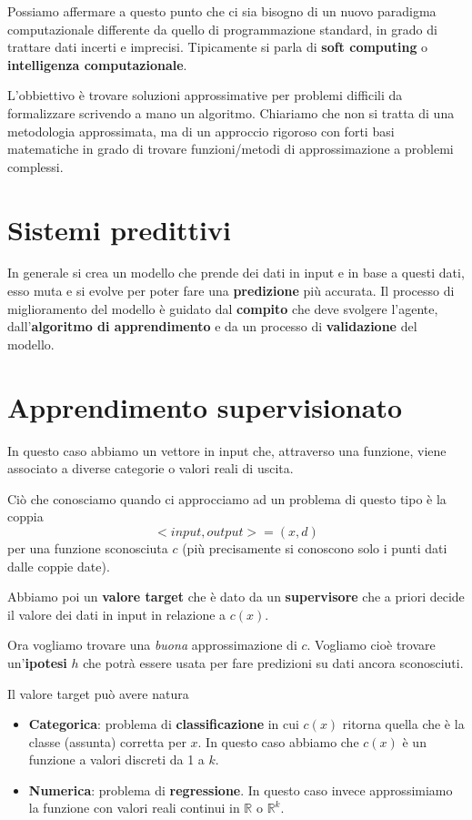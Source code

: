 Possiamo affermare a questo punto che ci sia bisogno di un nuovo paradigma computazionale differente da quello di
programmazione standard, in grado di trattare dati incerti e imprecisi. Tipicamente si parla di \textbf{soft computing} o
\textbf{intelligenza computazionale}.

L'obbiettivo \`e trovare soluzioni approssimative per problemi difficili da formalizzare scrivendo a mano un algoritmo.
Chiariamo che non si tratta di una metodologia approssimata, ma di un approccio rigoroso con forti basi
matematiche in grado di trovare funzioni/metodi di approssimazione a problemi complessi.

\section{Sistemi predittivi}
In generale si crea un modello che prende dei dati in input e in base a questi dati, esso muta e si evolve per poter
fare una \textbf{predizione} pi\`u accurata. Il processo di miglioramento del modello \`e guidato dal \textbf{compito}
che deve svolgere l'agente, dall'\textbf{algoritmo di apprendimento} e da un processo di \textbf{validazione} del modello.

\section{Apprendimento supervisionato}
In questo caso abbiamo un vettore in input che, attraverso una funzione, viene associato a diverse categorie o valori
reali di uscita.

Ci\`o che conosciamo quando ci approcciamo ad un problema di questo tipo \`e la coppia
\[ <input, output> = (x, d) \]
per una funzione sconosciuta $c$ (pi\`u precisamente si conoscono solo i punti dati dalle coppie date).

Abbiamo poi un \textbf{valore target} che \`e dato da un \textbf{supervisore} che a priori decide il valore dei dati
in input in relazione a $c(x)$.

Ora vogliamo trovare una \emph{buona} approssimazione di $c$. Vogliamo cio\`e trovare un'\textbf{ipotesi} $h$ che
potr\`a essere usata per fare predizioni su dati ancora sconosciuti.

Il valore target pu\`o avere natura
\begin{itemize}
	\item \textbf{Categorica}: problema di \textbf{classificazione} in cui $c(x)$ ritorna quella che \`e la classe
	      (assunta) corretta per $x$. In questo caso abbiamo che $c(x)$ \`e un funzione a valori discreti da 1 a $k$.
	\item \textbf{Numerica}: problema di \textbf{regressione}. In questo caso invece approssimiamo la funzione con
	      valori reali continui in $\mathbb{R}$ o $\mathbb{R}^k$.
\end{itemize}

